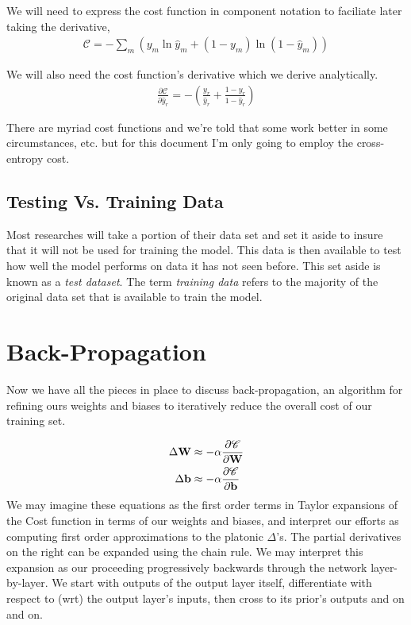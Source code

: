 \documentclass[twocolumn]{revtex4-1}
\newcommand{\bld}[1]{\vectorbold{#1}}
\newcommand{\cC}{\mathscr{C}}
\newcommand{\parpar}[2]{\frac{\partial #1}{\partial #2}}
\begin{document}
We will need to express the cost function in component notation to faciliate later taking the derivative,
\begin{align}
    \cC = - \sum_m \left( y_m \ln \hat{y}_m + (1 - y_m) \ln (1 - \hat{y}_m) \right)
\end{align}

We will also need the cost function's derivative which we derive analytically.
\begin{align}
    \parpar{\cC}{\hat{y}_r} = - \left( \frac{y_r}{\hat{y}_r} + \frac{1 - y_r}{1 - \hat{y}_r} \right)
\end{align}

There are myriad cost functions and we're told that some work better in some circumstances, etc. but for this document I'm only going to employ the cross-entropy cost.

\subsection{Testing Vs. Training Data}
Most researches will take a portion of their data set and set it aside to insure that it will not be used for training the model. This data is then available to test how well the model performs on data it has not seen before. This set aside is known as a \textit{test dataset}. The term \textit{training data} refers to the majority of the original data set that is available to train the model.

\section{Back-Propagation}
Now we have all the pieces in place to discuss back-propagation, an algorithm for refining ours weights and biases to iteratively reduce the overall cost of our training set. 

\begin{align}
    \label{eqn:deltas}
    \Delta \bld{W} & \approx - \alpha \parpar{\cC}{\bld{W}} \\
    \Delta \bld{b} & \approx - \alpha \parpar{\cC}{\bld{b}}
\end{align}
We may imagine these equations as the first order terms in Taylor expansions of the Cost function in terms of our weights and biases, and interpret our efforts as computing first order approximations to the platonic $\Delta$'s. The partial derivatives on the right can be expanded using the chain rule. We may interpret this expansion as our proceeding progressively backwards through the network layer-by-layer. We start with outputs of the output layer itself, differentiate with respect to (wrt) the output layer's inputs, then cross to its prior's outputs and on and on.
\end{document}
